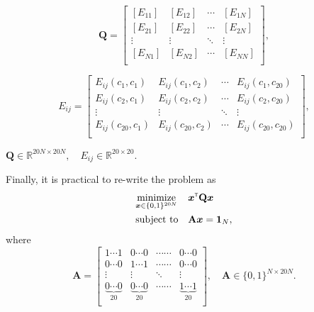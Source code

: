 \documentclass[12pt,twoside]{article}
\begin{document}
\[ \mathbf{Q} = 
\begin{bmatrix} [E_{11}] & [E_{12}]& \cdots & [E_{1N}] \\
		     [E_{21}] & [E_{22}]& \cdots & [E_{2N}] \\
		     \vdots	& \vdots	&	\ddots      &   \vdots \\
		     [E_{N1}] & [E_{N2}]& \cdots & [E_{NN}] \\
\end{bmatrix}, 						\]





\[E_{ij} = 
\begin{bmatrix} E_{ij}(c_1,c_1) & E_{ij}(c_1,c_2)& \cdots & E_{ij}(c_1,c_{20}) \\
		     E_{ij}(c_2,c_1) & E_{ij}(c_2,c_2)& \cdots & E_{ij}(c_2,c_{20}) \\
		     \vdots	& \vdots	&	\ddots      &   \vdots \\
		     E_{ij}(c_{20},c_1) & E_{ij}(c_{20},c_2)& \cdots & E_{ij}(c_{20},c_{20}) \\
\end{bmatrix}, 						\]
\begin{center}
 $\mathbf{Q} \in \mathbb{R}^{20N\times20N},\quad E_{ij} \in \mathbb{R}^{20\times20} $.
\end{center}\par\bigskip
Finally, it is practical to re-write the problem as
\begin{equation}
\label{4}
\begin{aligned}
	&\underset{\vec{x}\in\{0,1\}^{20N}}{\text{minimize}} &&\vec{x}\T\mathbf{Q}\vec{x} \\
	&\text{subject to} && \mathbf{A}\vec{x} = \mathbf{1}_N,
\end{aligned}
\end{equation}
where 
\[ \mathbf{A} = 
\begin{bmatrix} 1 \cdots 1 & 0 \cdots 0 & \cdots\cdots & 0\cdots 0 \\
		     0 \cdots 0 & 1 \cdots 1 & \cdots\cdots & 0\cdots 0 \\
		     \vdots	& \vdots	&	\ddots      &   \vdots \\
		     \underbrace{0 \cdots 0 }_{20}& \underbrace{0 \cdots 0 }_{20} & \cdots\cdots & \underbrace{1 \cdots 1 }_{20} \\   
\end{bmatrix},  \quad\mathbf{A} \in \{0,1\}^{N\times20N}. \]\par
\end{document}
